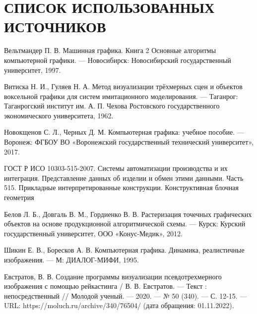 \section*{СПИСОК ИСПОЛЬЗОВАННЫХ ИСТОЧНИКОВ}

\begingroup
\renewcommand{\section}[2]{}

\begin{thebibliography}{}
	
	Вельтмандер П. В. Машинная графика. Книга 2 Основные алгоритмы компьютерной графики. --- Новосибирск: Новосибирский государственный университет, 1997.
	
	Витиска Н. И., Гуляев Н. А. Метод визуализации трёхмерных сцен и объектов воксельной графики для систем имитационного моделирования. --- Таганрог: Таганрогский институт им. А. П. Чехова Ростовского государственного экономического университета, 1962.
	
	Новокщенов С. Л., Черных Д. М. Компьютерная графика: учебное пособие. --- Воронеж: ФГБОУ ВО
	«Воронежский государственный технический университет», 2017.
	
	ГОСТ Р ИСО 10303-515-2007. Системы автоматизации производства и их интеграция. Представление данных об изделии и обмен этими данными. Часть 515. Прикладные интерпретированные конструкции. Конструктивная блочная геометрия
	
	Белов Л. Б., Довгаль В. М., Гордиенко В. В. Растеризация точечных графических объектов на основе продукционной алгоритмической схемы. --- Курск: Курский государственный университет, ООО «Конус-Медик», 2012.
	
	Шикин Е. В., Боресков А. В. Компьютерная графика. Динамика, реалистичные изображения. --- М: ДИАЛОГ-МИФИ, 1995.
	
	Евстратов, В. В. Создание программы визуализации псевдотрехмерного изображения с помощью рейкастинга / В. В. Евстратов. — Текст : непосредственный // Молодой ученый. — 2020. — № 50 (340). — С. 12-15. — URL: https://moluch.ru/archive/340/76504/ (дата обращения: 01.11.2022).
	

\end{thebibliography}
